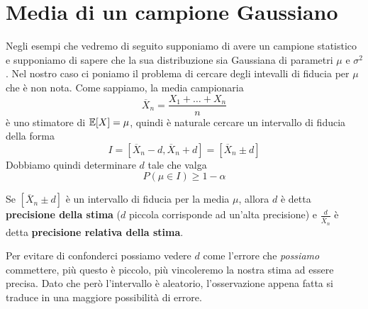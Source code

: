 \section{Media di un campione Gaussiano}
Negli esempi che vedremo di seguito supponiamo di avere un campione statistico e supponiamo di
sapere che la sua distribuzione sia Gaussiana di parametri $\mu$ e $\sigma^2$. Nel nostro caso ci
poniamo il problema di cercare degli intevalli di fiducia per $\mu$ che è non nota. Come sappiamo,
la media campionaria
\[ \overline{X}_n = \frac{X_1 + \dots + X_n}{n} \]
è uno stimatore di $\mathbb{E}[X] = \mu$, quindi è naturale cercare un intervallo di fiducia della forma
\[ I = [\overline{X}_n - d, \overline{X}_n + d] = [\overline{X}_n \pm d] \]
Dobbiamo quindi determinare $d$ tale che valga
\[ P(\mu \in I) \geq 1 - \alpha \]

\begin{definition}
	Se $[\overline{X}_n \pm d]$ è un intervallo di fiducia per la media $\mu$, allora $d$ è detta
	\textbf{precisione della stima} ($d$ piccola corrisponde ad un'alta precisione) e
	$\frac{d}{\overline{X}_n}$ è detta \textbf{precisione relativa della stima}.
\end{definition}

Per evitare di confonderci possiamo vedere $d$ come l'errore che \emph{possiamo} commettere, più
questo è piccolo, più vincoleremo la nostra stima ad essere precisa. Dato che però l'intervallo è
aleatorio, l'osservazione appena fatta si traduce in una maggiore possibilità di errore.

